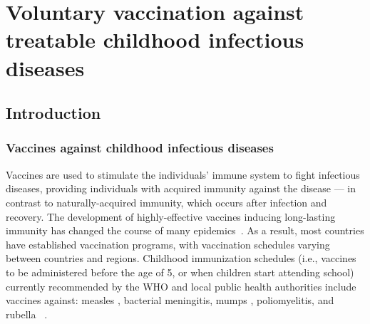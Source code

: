 \chapter{Voluntary vaccination against treatable childhood infectious diseases} 
\label{Vaccine}
\hypertarget{Vaccine}{}


\section{Introduction}
\label{Vaccine:Intro}
\subsection{Vaccines against childhood infectious diseases}
Vaccines are used to stimulate the individuals' immune system to fight infectious diseases, providing individuals with acquired immunity against the disease --- in contrast to naturally-acquired immunity, which occurs after infection and recovery. %
%
The development of highly-effective vaccines inducing long-lasting immunity has changed the course of many epidemics~\cite[]{CDC_10achievements}. As a result, most countries have established vaccination programs, with vaccination schedules varying between countries and regions. Childhood immunization schedules (i.e., vaccines to be administered before the age of 5, or when children start attending school) currently recommended by the WHO and local public health authorities include vaccines against: measles%
, bacterial meningitis, mumps%
, poliomyelitis, and rubella%
~\cite[]{CDC_PinkBook,CalendrierVaccinal2019}. 

